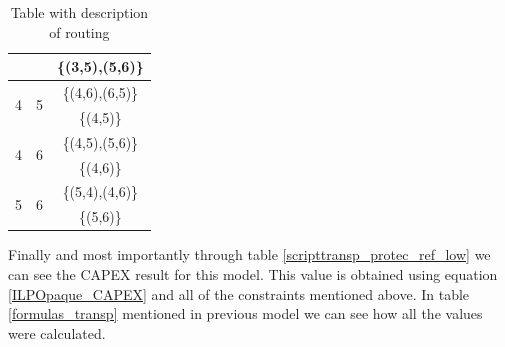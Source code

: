 \begin{table}[h!]
\begin{tabular}{|| c | c | c ||}
 & & \{(3,5),(5,6)\} \\ \hline
 \multirow{2}{*}{4} & \multirow{2}{*}{5} & \{(4,6),(6,5)\} \\
 & & \{(4,5)\} \\ \hline
 \multirow{2}{*}{4} & \multirow{2}{*}{6} & \{(4,5),(5,6)\} \\
 & & \{(4,6)\} \\ \hline
 \multirow{2}{*}{5} & \multirow{2}{*}{6} & \{(5,4),(4,6)\} \\
 & & \{(5,6)\} \\
 \hline
\end{tabular}
\caption{Table with description of routing}
\label{path_transp_protec_ref_low}
\end{table}


Finally and most importantly through table \ref{scripttransp_protec_ref_low} we can see the CAPEX result for this model. This value is obtained using equation \ref{ILPOpaque_CAPEX} and all of the constraints mentioned above. In table \ref{formulas_transp} mentioned in previous model we can see how all the values were calculated.\\

